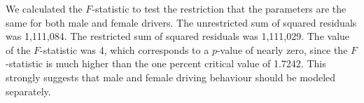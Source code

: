 



We calculated the $F$-statistic to test the restriction 
that the parameters are the same for both male and female drivers. 
The unrestricted sum of squared residuals was 1,111,084. 
The restricted sum of squared residuals was 1,111,029. 
The value of the $F$-statistic was 4, 
which corresponds to a $p$-value of nearly zero, since the $F$-statistic is much higher than 
 the one percent critical value of 1.7242. 
This strongly suggests that male and female driving behaviour should be modeled separately. 
